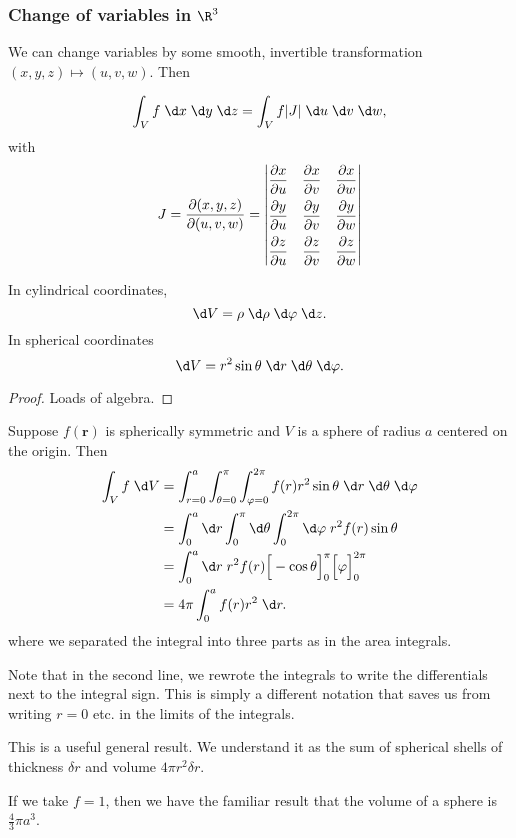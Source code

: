 \documentclass[a4paper]{article}
\begin{document}
\subsubsection{Change of variables in \texorpdfstring{$\R^3$}{R3}}
We can change variables by some smooth, invertible transformation $(x, y, z)\mapsto (u, v, w)$. Then
\begin{prop}
  \[
    \int_V f\;\d x\;\d y\;\d z = \int_V f|J|\;\d u\;\d v\;\d w,
  \]
  with
  \[
    J = \frac{\partial(x, y, z)}{\partial(u, v, w)} =
    \begin{vmatrix}
      \dfrac{\partial x}{\partial u} & \dfrac{\partial x}{\partial v} & \dfrac{\partial x}{\partial w}\vspace{5pt} \\ 
      \dfrac{\partial y}{\partial u} & \dfrac{\partial y}{\partial v} & \dfrac{\partial y}{\partial w}\vspace{5pt} \\ 
      \dfrac{\partial z}{\partial u} & \dfrac{\partial z}{\partial v} & \dfrac{\partial z}{\partial w}
    \end{vmatrix}
  \]
\end{prop}

\begin{prop}
  In cylindrical coordinates,
  \[
    \d V = \rho\;\d \rho\;\d \varphi\;\d z.
  \]
  In spherical coordinates 
  \[
    \d V = r^2\sin\theta \;\d r\;\d \theta\;\d \varphi.
  \]
\end{prop}

\begin{proof}
  Loads of algebra.
\end{proof}

\begin{eg}
  Suppose $f(\mathbf{r})$ is spherically symmetric and $V$ is a sphere of radius $a$ centered on the origin. Then
  \begin{align*}
    \int_V f\;\d V &= \int_{r = 0}^a \int_{\theta = 0}^\pi \int_{\varphi = 0}^{2\pi} f(r)r^2 \sin\theta\;\d r\;\d \theta\;\d\varphi\\
    &= \int_0^a \d r\int_0^\pi \d \theta\int_0^{2\pi} \d \varphi \;r^2 f(r) \sin \theta\\
    &= \int_0^a \d r\; r^2 f(r) \Big[-\cos \theta\Big]_0^\pi \Big[\varphi\Big]_0^{2\pi}\\
    &= 4\pi\int_0^a f(r)r^2 \;\d r.
  \end{align*}
  where we separated the integral into three parts as in the area integrals.

  Note that in the second line, we rewrote the integrals to write the differentials next to the integral sign. This is simply a different notation that saves us from writing $r = 0$ etc. in the limits of the integrals.

  This is a useful general result. We understand it as the sum of spherical shells of thickness $\delta r$ and volume $4\pi r^2 \delta r$.

  If we take $f = 1$, then we have the familiar result that the volume of a sphere is $\frac{4}{3}\pi a^3$.
\end{eg}
\end{document}
